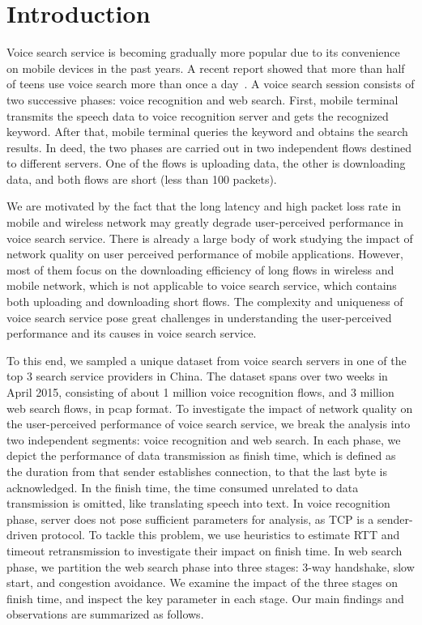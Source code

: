 
\section{Introduction}
\label{sec:intro}

Voice search service is becoming gradually more popular due to its convenience on mobile devices in the past years. A recent report showed that more than half of teens use voice search more than once a day~\cite{voice_search_report}. A voice search session consists of two successive phases: voice recognition and web search. First, mobile terminal transmits the speech data to voice recognition server and gets the recognized keyword. After that, mobile terminal queries the keyword and obtains the search results. In deed, the two phases are carried out in two independent flows destined to different servers. One of the flows is uploading data, the other is downloading data, and both flows are short (less than 100 packets).

We are motivated by the fact that the long latency and high packet loss rate in mobile and wireless network may greatly degrade user-perceived performance in voice search service. There is already a large body of work \cite{sommers2012cell,yu2014can,chen2012network,sharma2010goodput} studying the impact of network quality on user perceived performance of mobile applications. However, most of them focus on the downloading efficiency of long flows in wireless and mobile network, which is not applicable to voice search service, which contains both uploading and downloading short flows. The complexity and uniqueness of voice search service pose great challenges in understanding the user-perceived performance and its causes in voice search service.

To this end, we sampled a unique dataset from voice search servers in one of the top 3 search service providers in China. The dataset spans over two weeks in April 2015, consisting of about 1 million voice recognition flows, and 3 million web search flows, in pcap format. To investigate the impact of network quality on the user-perceived performance of voice search service, we break the analysis into two independent segments: voice recognition and web search. In each phase, we depict the performance of data transmission as finish time, which is defined as the duration from that sender establishes connection, to that the last byte is acknowledged. In the finish time, the time consumed unrelated to data transmission is omitted, like translating speech into text. In voice recognition phase, server does not pose sufficient parameters for analysis, as TCP is a sender-driven protocol. To tackle this problem, we use heuristics to estimate RTT and timeout retransmission to investigate their impact on finish time. In web search phase, we partition the web search phase into three stages: 3-way handshake, slow start, and congestion avoidance. We examine the impact of the three stages on finish time, and inspect the key parameter in each stage. Our main findings and observations are summarized as follows.

